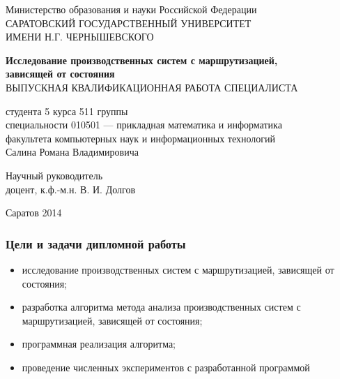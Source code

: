 
\begin{frame}[plain]
\begin{center}
Министерство образования и науки Российской Федерации\\
САРАТОВСКИЙ ГОСУДАРСТВЕННЫЙ УНИВЕРСИТЕТ\\
ИМЕНИ Н.Г. ЧЕРНЫШЕВСКОГО
\end{center}


\vfill

\begin{center}
\textbf{Исследование производственных систем с маршрутизацией,\\зависящей от состояния}\\
\medskip
ВЫПУСКНАЯ КВАЛИФИКАЦИОННАЯ РАБОТА СПЕЦИАЛИСТА
\end{center}
\begin{flushleft}
студента 5 курса 511 группы\\
специальности 010501 --- прикладная математика и информатика\\
факультета компьютерных наук и информационных технологий\\
Салина Романа Владимировича
\end{flushleft}

\vfill

\noindent
\begin{flushleft}
Научный руководитель\\
доцент, к.ф.-м.н. \hfill В. И. Долгов\\
\end{flushleft}

\vfill

\begin{center}
Саратов 2014
\end{center}
\end{frame}


\begin{frame} \frametitle{Цели и задачи дипломной работы}
\begin{itemize}
\item исследование производственных систем с маршрутизацией, зависящей от состояния;
\item разработка алгоритма метода анализа производственных систем с маршрутизацией, зависящей от состояния;
\item программная реализация алгоритма;
\item проведение численных экспериментов с разработанной программой
\end{itemize}
\end{frame}

